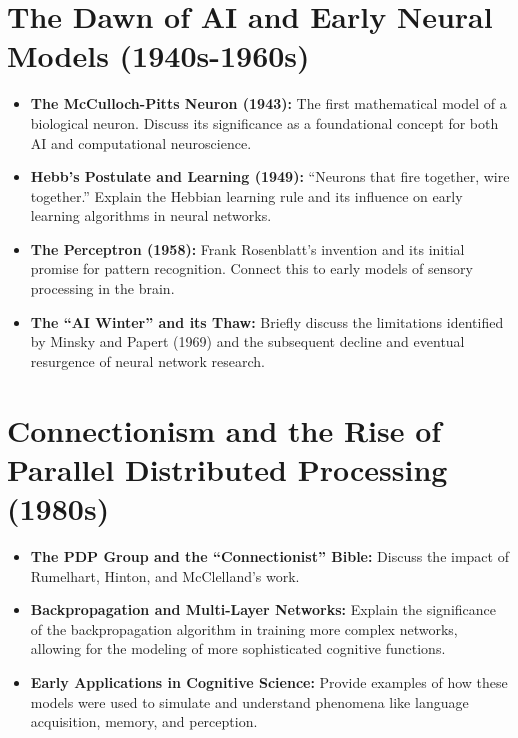\documentclass[11pt,a4paper]{article}
\begin{document}
\section{The Dawn of AI and Early Neural Models (1940s-1960s)}
\begin{itemize}
    \item \textbf{The McCulloch-Pitts Neuron (1943):} The first mathematical model of a biological neuron. Discuss its significance as a foundational concept for both AI and computational neuroscience.
    \item \textbf{Hebb's Postulate and Learning (1949):} ``Neurons that fire together, wire together.'' Explain the Hebbian learning rule and its influence on early learning algorithms in neural networks.
    \item \textbf{The Perceptron (1958):} Frank Rosenblatt's invention and its initial promise for pattern recognition. Connect this to early models of sensory processing in the brain.
    \item \textbf{The ``AI Winter'' and its Thaw:} Briefly discuss the limitations identified by Minsky and Papert (1969) and the subsequent decline and eventual resurgence of neural network research.
\end{itemize}

\section{Connectionism and the Rise of Parallel Distributed Processing (1980s)}
\begin{itemize}
    \item \textbf{The PDP Group and the ``Connectionist'' Bible:} Discuss the impact of Rumelhart, Hinton, and McClelland's work.
    \item \textbf{Backpropagation and Multi-Layer Networks:} Explain the significance of the backpropagation algorithm in training more complex networks, allowing for the modeling of more sophisticated cognitive functions.
    \item \textbf{Early Applications in Cognitive Science:} Provide examples of how these models were used to simulate and understand phenomena like language acquisition, memory, and perception.
\end{itemize}
\end{document}

